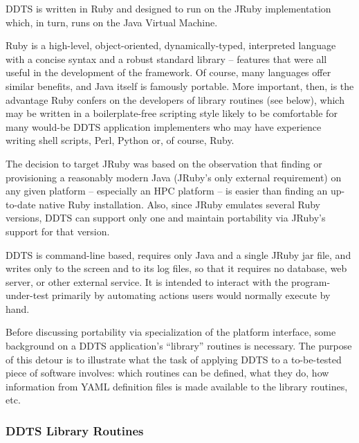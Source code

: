 \documentclass[conference]{IEEEtran}
\begin{document}
DDTS is written in Ruby \cite{ruby} and designed to run on the JRuby \cite{jruby} implementation which, in turn, runs on the Java Virtual Machine.

Ruby is a high-level, object-oriented, dynamically-typed, interpreted language with a concise syntax and a robust standard library -- features that were all useful in the development of the framework. Of course, many languages offer similar benefits, and Java itself is famously portable. More important, then, is the advantage Ruby confers on the developers of library routines (see below), which may be written in a boilerplate-free scripting style likely to be comfortable for many would-be DDTS application implementers who may have experience writing shell scripts, Perl, Python or, of course, Ruby.

The decision to target JRuby was based on the observation that finding or provisioning a reasonably modern Java (JRuby's only external requirement) on any given platform -- especially an HPC platform -- is easier than finding an up-to-date native Ruby installation. Also, since JRuby emulates several Ruby versions, DDTS can support only one and maintain portability via JRuby's support for that version.

DDTS is command-line based, requires only Java and a single JRuby jar file, and writes only to the screen and to its log files, so that it requires no database, web server, or other external service. It is intended to interact with the program-under-test primarily by automating actions users would normally execute by hand.

Before discussing portability via specialization of the platform interface, some background on a DDTS application's ``library'' routines is necessary. The purpose of this detour is to illustrate what the task of applying DDTS to a to-be-tested piece of software involves: which routines can be defined, what they do, how information from YAML definition files is made available to the library routines, etc.

\subsubsection{DDTS Library Routines}
\end{document}
